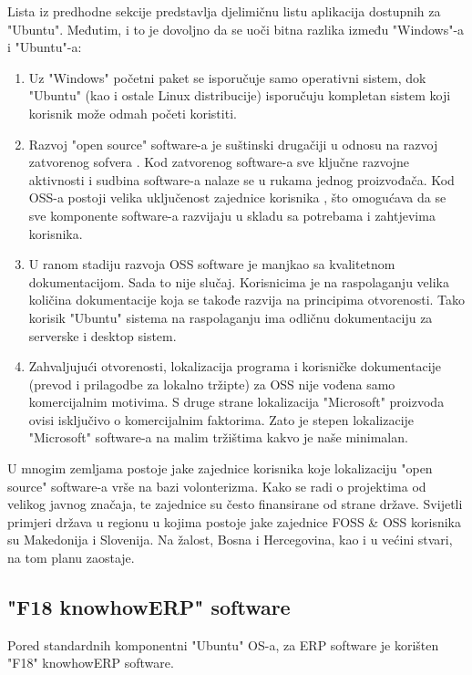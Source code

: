 \documentclass[times, utf8, seminar]{fit}
\begin{document}
Lista iz predhodne sekcije predstavlja djelimičnu listu aplikacija dostupnih za "Ubuntu". Međutim, i to je dovoljno da se uoči bitna razlika između "Windows"-a i "Ubuntu"-a:
\begin{enumerate}
  \item Uz "Windows" početni paket se isporučuje samo operativni sistem, dok "Ubuntu" (kao i ostale Linux distribucije) isporučuju kompletan sistem koji korisnik može odmah početi koristiti.
  \item Razvoj "open source" software-a je suštinski drugačiji u odnosu na razvoj zatvorenog sofvera \cite{bazaar}. Kod zatvorenog software-a sve ključne razvojne aktivnosti i sudbina software-a nalaze se u rukama jednog proizvođača. Kod OSS-a postoji velika uključenost zajednice korisnika , što omogućava da se sve komponente software-a razvijaju u skladu sa potrebama i zahtjevima korisnika. 
  \item U ranom stadiju razvoja OSS software je manjkao sa kvalitetnom dokumentacijom. Sada to nije slučaj. Korisnicima je na raspolaganju velika količina dokumentacije koja se takođe razvija na principima otvorenosti. Tako korisik "Ubuntu" sistema na raspolaganju ima odličnu dokumentaciju za serverske \cite{ubuntudesktop} i desktop \cite{ubuntuserver} sistem.
  \item Zahvaljujući otvorenosti, lokalizacija programa i korisničke dokumentacije (prevod i prilagodbe za lokalno tržipte) za OSS nije vođena samo komercijalnim motivima. S druge strane lokalizacija "Microsoft" proizvoda ovisi isključivo o komercijalnim faktorima. Zato je stepen lokalizacije "Microsoft" software-a na malim tržištima kakvo je naše minimalan.   
\end{enumerate}

U mnogim zemljama postoje jake zajednice korisnika koje lokalizaciju "open source" software-a vrše na bazi volonterizma. Kako se radi o projektima od velikog javnog značaja, te zajednice su često finansirane od strane države. 
Svijetli primjeri država u regionu u kojima postoje jake zajednice FOSS  \& OSS  korisnika su Makedonija i Slovenija.
Na žalost, Bosna i Hercegovina, kao i u većini stvari, na tom planu zaostaje. 

\subsection{"F18 knowhowERP" software}
Pored standardnih komponentni "Ubuntu" OS-a, za ERP software je korišten "F18" knowhowERP software.
\end{document}
